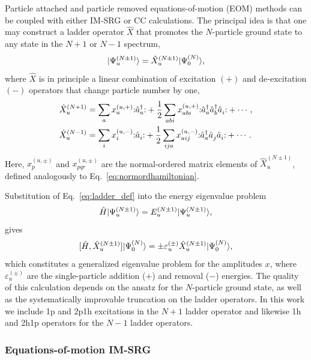Particle attached and particle removed equations-of-motion (EOM) methods can be coupled with either IM-SRG or CC calculations. The principal idea is that one may construct a ladder operator $\hat{X}$ that promotes the $N$-particle ground state to any state in the $N + 1$ or $N - 1$ spectrum,
\begin{equation}\label{eq:ladder_def}
  | \Psi^{(N \pm 1)}_u \rangle  = \hat{X}^{(N \pm 1)}_u | \Psi^{(N)}_0 \rangle,
\end{equation}
where $\hat{X}$ is in principle a linear combination of excitation $(+)$ and de-excitation $(-)$ operators that change particle number by one,
\begin{align}
  \label{eq:gen_attached}
  \hat{X}^{(N + 1)}_u &= \sum_a x^{(u, +)}_a  \mathopen: \hat{a}^\dagger_a \mathclose: + \frac{1}{2} \sum_{a b i} x^{(u, +)}_{a b i} \mathopen: \hat{a}^\dagger_a \hat{a}^\dagger_b \hat{a}_i^{} \mathclose: + \cdots,  \\
  \label{eq:gen_removed}
  \hat{X}^{(N - 1)}_u &= \sum_i x_i^{(u, -)} \mathopen: \hat{a}_i^{} \mathclose: + \frac{1}{2} \sum_{i j a} x^{(u, -)}_{a i j} \mathopen: \hat{a}^\dagger_a \hat{a}_j^{} \hat{a}_i^{} \mathclose:  + \cdots.
\end{align}
Here, $x^{(u, \pm)}_p$ and $x^{(u, \pm)}_{p q r}$ are the normal-ordered matrix elements of $\hat{X}_u^{(N \pm 1)}$, defined analogously to Eq.\ \eqref{eq:normordhamiltonian}.

Substitution of Eq.\ \eqref{eq:ladder_def} into the energy eigenvalue problem
\begin{gather*}
  \hat H | \Psi_u^{(N \pm 1)} \rangle = E^{(N\pm1)}_u | \Psi_u^{(N \pm 1)} \rangle,
\end{gather*}
gives
\begin{equation}\label{eq:EOM}
  [\hat{H}, \hat{X}^{(N \pm 1)}_u] | \Psi^{(N)}_0 \rangle = \pm \varepsilon^{(\pm)}_u \hat{X}^{(N \pm 1)}_u | \Psi^{(N)}_0 \rangle,
\end{equation}
which constitutes a generalized eigenvalue problem for the amplitudes $x$, where $\varepsilon^{(\pm)}_u$ are the single-particle addition ($+$) and removal ($-$) energies. The quality of this calculation depends on the ansatz for the $N$-particle ground state, as well as the systematically improvable truncation on the ladder operators. In this work we include 1p and 2p1h excitations in the $N + 1$ ladder operator and likewise 1h and 2h1p operators for the $N - 1$ ladder operators.

\subsubsection*{Equations-of-motion IM-SRG}

